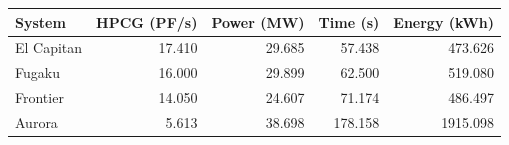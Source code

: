 \begin{tabular}{lrrrr}\toprule System & HPCG (PF/s) & Power (MW) & Time (s) & Energy (kWh) \\\midrule
El Capitan & 17.410 & 29.685 & 57.438 & 473.626 \\
Fugaku & 16.000 & 29.899 & 62.500 & 519.080 \\
Frontier & 14.050 & 24.607 & 71.174 & 486.497 \\
Aurora & 5.613 & 38.698 & 178.158 & 1915.098 \\
\bottomrule\end{tabular}
